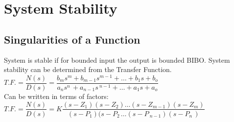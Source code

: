 \setchapterpreamble[u]{\margintoc}
\chapter[System Stability ($4^{th}$ Lecture)]{System Stability}

\section{Singularities of a Function}

System is stable if for bounded input the output is bounded BIBO.
System stability can be determined from the Transfer Function.\\[+1em]

$T.F. = \dfrac{N(s)}{D(s)} = \dfrac{b_ms^m+b_{m-1}s^{m-1}+\ldots+b_1s+b_o}{a_ns^{n\ }+a_{n-1}s^{\ n-1}+\ldots+a_1s+a_o}$\\[+1em]

Can be written in terms of factors:\\[+1em]

$T.F. = \dfrac{N(s)}{D(s)} = K \dfrac{(s-Z_1)(s-Z_2)\ldots(s-Z_{m-1})(s-Z_m)}{(s-P_1)(s-P_{2\ }\ldots(s-P_{\ n-1})(s-P_{n\ })}$\\[+1em]
